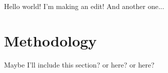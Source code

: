 \documentclass{article}
\begin{document}
Hello world! I'm making an edit! And another one...

\section{Methodology}

Maybe I'll include this section? or here? or here?
\end{document}
